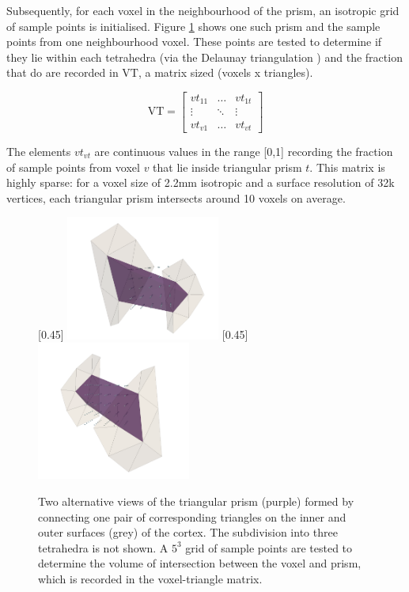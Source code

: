 \documentclass[12pt]{report}
\newcommand{\mat}[1]{\mathrm{#1}}
\begin{document}
Subsequently, for each voxel in the neighbourhood of the prism, an isotropic grid of sample points is initialised. Figure \ref{prism} shows one such prism and the sample points from one neighbourhood voxel. These points are tested to determine if they lie within each tetrahedra (via the Delaunay triangulation \cite{Barber:1996:QAC:235815.235821}) and the fraction that do are recorded in $\mat{VT}$, a matrix sized (voxels x triangles). 

\begin{equation}
\mat{VT} = 
\begin{bmatrix}
vt_{11} & \ldots & vt_{1t} \\
\vdots & \ddots & \vdots \\
vt_{v1} & \ldots & vt_{vt}
\end{bmatrix}
\end{equation}

The elements $vt_{vt}$ are continuous values in the range [0,1] recording the fraction of sample points from voxel $v$ that lie inside triangular prism $t$. This matrix is highly sparse: for a voxel size of 2.2mm isotropic and a surface resolution of 32k vertices, each triangular prism intersects around 10 voxels on average.

\begin{figure}[H]
\centering
\subcaptionbox{\label{prism1}}[0.45\textwidth]
{\includegraphics[width=0.45\textwidth]{prism4}}
\subcaptionbox{\label{prism2}}[0.45\textwidth]
{\includegraphics[width=0.45\textwidth]{prism1}}
\caption{Two alternative views of the triangular prism (purple) formed by connecting one pair of corresponding triangles on the inner and outer surfaces (grey) of the cortex. The subdivision into three tetrahedra is not shown. A $5^3$ grid of sample points are tested to determine the volume of intersection between the voxel and prism, which is recorded in the voxel-triangle matrix.} 
\label{prism}
\end{figure}
\end{document}
